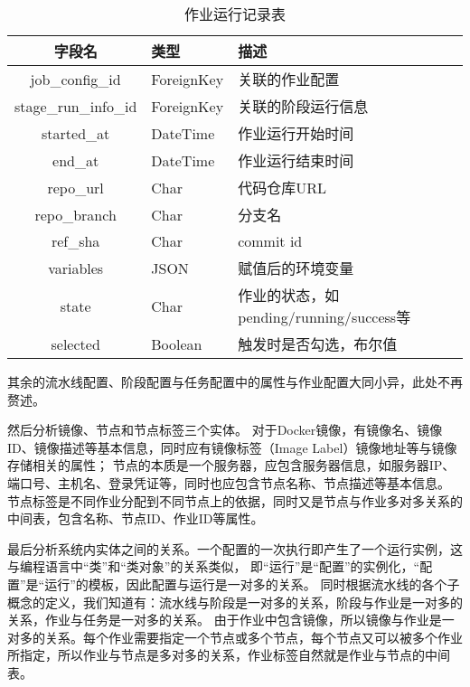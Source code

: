 \begin{table}[h]
  \centering
  \caption{作业运行记录表}
  \label{tab:作业运行记录表}
  \begin{tabular}{cll}
    \toprule
    字段名               & 类型          & 描述                                               \\
    \midrule
    job\_config\_id     & ForeignKey   & 关联的作业配置                                     \\
    stage\_run\_info\_id    & ForeignKey   & 关联的阶段运行信息                                 \\
    started\_at         & DateTime     & 作业运行开始时间                                   \\
    end\_at             & DateTime     & 作业运行结束时间                                   \\
    repo\_url           & Char         & 代码仓库URL                                      \\
    repo\_branch        & Char         & 分支名                                           \\
    ref\_sha            & Char         & commit id                                       \\
    variables           & JSON         & 赋值后的环境变量                                  \\
    state               & Char         & 作业的状态，如pending/running/success等            \\
    selected            & Boolean      & 触发时是否勾选，布尔值                             \\
    \bottomrule
  \end{tabular}
\end{table}

其余的流水线配置、阶段配置与任务配置中的属性与作业配置大同小异，此处不再赘述。

然后分析镜像、节点和节点标签三个实体。
对于Docker镜像，有镜像名、镜像ID、镜像描述等基本信息，同时应有镜像标签（Image Label）镜像地址等与镜像存储相关的属性；
节点的本质是一个服务器，应包含服务器信息，如服务器IP、端口号、主机名、登录凭证等，同时也应包含节点名称、节点描述等基本信息。
节点标签是不同作业分配到不同节点上的依据，同时又是节点与作业多对多关系的中间表，包含名称、节点ID、作业ID等属性。

最后分析系统内实体之间的关系。一个配置的一次执行即产生了一个运行实例，这与编程语言中“类”和“类对象”的关系类似，
即“运行”是“配置”的实例化，“配置”是“运行”的模板，因此配置与运行是一对多的关系。
同时根据流水线的各个子概念的定义，我们知道有：流水线与阶段是一对多的关系，阶段与作业是一对多的关系，作业与任务是一对多的关系。
由于作业中包含镜像，所以镜像与作业是一对多的关系。每个作业需要指定一个节点或多个节点，每个节点又可以被多个作业所指定，所以作业与节点是多对多的关系，作业标签自然就是作业与节点的中间表。

